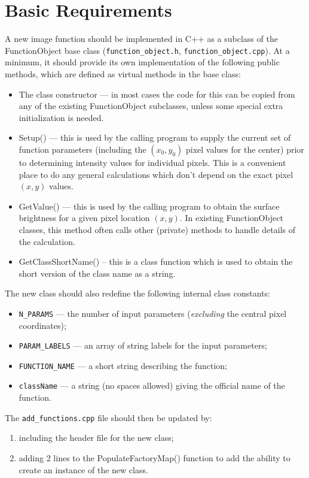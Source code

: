 \documentclass[10pt,a4paper,article]{memoir}
\begin{document}
\section{Basic Requirements}

A new image function should be implemented in C++ as a subclass of
the FunctionObject base class (\texttt{function\_object.h}, \texttt{function\_object.cpp}).
At a minimum, it should provide its own implementation of the following public methods,
which are defined as virtual methods in the base class:
\begin{itemize}
\item The class constructor --- in most cases the code for this can be copied from any of the
existing FunctionObject subclasses, unless some special extra initialization is needed.
\item Setup() --- this is used by the calling program to supply the current set of
function parameters (including the $(x_{0},y_{0})$ pixel values for the center) prior
to determining intensity values for individual pixels. This
is a convenient place to do any general calculations which don't depend on the
exact pixel $(x,y)$ values.
\item GetValue() --- this is used by the calling program to obtain the surface
brightness for a given pixel location $(x,y)$. In existing FunctionObject classes,
this method often calls other (private) methods to handle details of the calculation.
\item GetClassShortName() -- this is a class function which is used to obtain
the short version of the class name as a string.

\end{itemize}

The new class should also redefine the following internal class constants:
\begin{itemize}
\item \texttt{N\_PARAMS} --- the number of input parameters (\textit{excluding} the
central pixel coordinates);
\item \texttt{PARAM\_LABELS} --- an array of string labels for the input parameters;
\item \texttt{FUNCTION\_NAME} --- a short string describing the function;
\item \texttt{className} --- a string (no spaces allowed) giving the official name
of the function.
\end{itemize}

The \texttt{add\_functions.cpp} file should then be updated by:
\begin{enumerate}
\item including the header file for the new class;
\item adding 2 lines to the PopulateFactoryMap() function to add the ability to create an instance of
the new class.
\end{enumerate}
\end{document}
